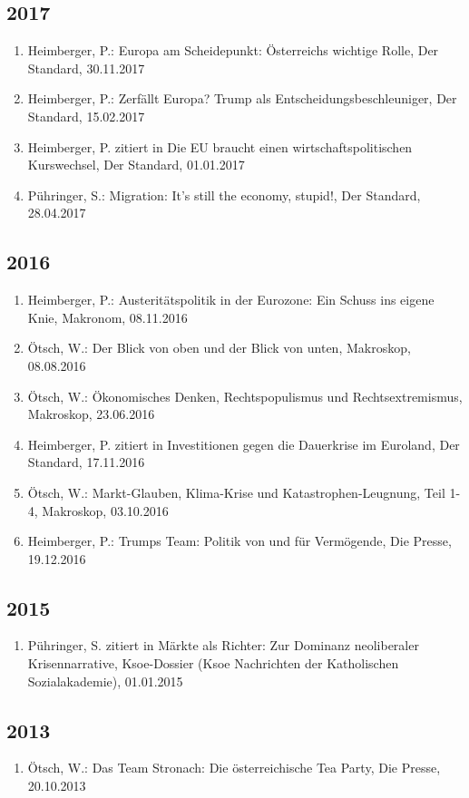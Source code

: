 \subsection*{2017}
\begin{enumerate}
	 \item Heimberger, P.: Europa am Scheidepunkt: Österreichs wichtige Rolle, Der Standard, 30.11.2017
	 \item Heimberger, P.: Zerfällt Europa? Trump als Entscheidungsbeschleuniger, Der Standard, 15.02.2017
	 \item Heimberger, P. zitiert in Die EU braucht einen wirtschaftspolitischen Kurswechsel, Der Standard, 01.01.2017
	 \item Pühringer, S.: Migration: It's still the economy, stupid!, Der Standard, 28.04.2017
\end{enumerate}
\subsection*{2016}
\begin{enumerate}
	 \item Heimberger, P.: Austeritätspolitik in der Eurozone: Ein Schuss ins eigene Knie, Makronom, 08.11.2016
	 \item Ötsch, W.: Der Blick von oben und der Blick von unten, Makroskop, 08.08.2016
	 \item Ötsch, W.: Ökonomisches Denken, Rechtspopulismus und Rechtsextremismus, Makroskop, 23.06.2016
	 \item Heimberger, P. zitiert in Investitionen gegen die Dauerkrise im Euroland, Der Standard, 17.11.2016
	 \item Ötsch, W.: Markt-Glauben, Klima-Krise und Katastrophen-Leugnung, Teil 1-4, Makroskop, 03.10.2016
	 \item Heimberger, P.: Trumps Team: Politik von und für Vermögende, Die Presse, 19.12.2016
\end{enumerate}
\subsection*{2015}
\begin{enumerate}
	 \item Pühringer, S. zitiert in Märkte als Richter: Zur Dominanz neoliberaler Krisennarrative, Ksoe-Dossier (Ksoe Nachrichten der Katholischen Sozialakademie), 01.01.2015
\end{enumerate}
\subsection*{2013}
\begin{enumerate}
	 \item Ötsch, W.: Das Team Stronach: Die österreichische Tea Party, Die Presse, 20.10.2013
\end{enumerate}
